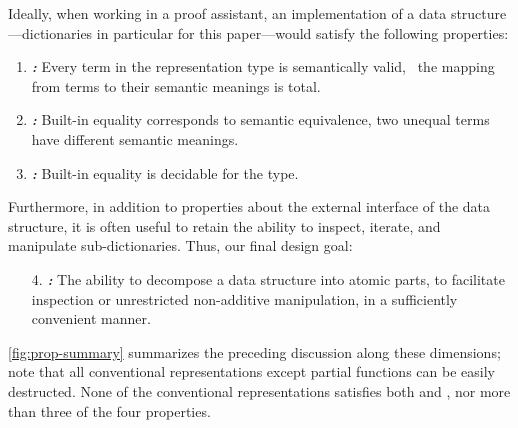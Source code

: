 
Ideally, when working in a proof assistant, an implementation of a data structure---dictionaries in particular for this paper---would satisfy the following properties:

\newcommand{\designGoal}[1]
  {\textbf{\emph{#1:}}}

\begin{enumerate}

\item
%
\designGoal{\SemTot}
%
Every term in the representation type is semantically valid, \ie{}~the mapping from terms to their semantic meanings is total.

\item
%
\designGoal{\SemInj}
%
Built-in equality corresponds to semantic equivalence, \ie{} two unequal terms have different semantic meanings.

\item
%
\designGoal{\EqDec}
%
Built-in equality is decidable for the type.

\end{enumerate}

Furthermore, in addition to properties about the external interface of the data structure, it is often useful to retain the ability to inspect, iterate, and manipulate sub-dictionaries.
%
Thus, our final design goal:

\begin{enumerate}

\item[4.]
%
\designGoal{\EzDstr}
%
The ability to decompose a data structure into atomic parts, to facilitate inspection or unrestricted non-additive manipulation, in a sufficiently convenient manner.

\end{enumerate}

\autoref{fig:prop-summary} summarizes the preceding discussion along these dimensions; note that all conventional representations except partial functions can be easily destructed.
%
%
%
None of the conventional representations satisfies both \SemTot{} and \SemInj{}, nor more than three of the four properties.


